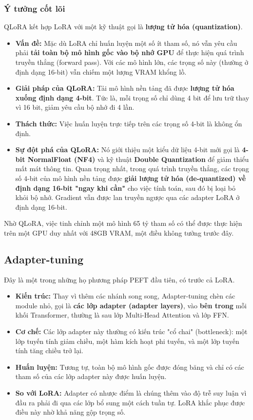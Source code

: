 \subsubsection{Ý tưởng cốt lõi}
QLoRA kết hợp LoRA với một kỹ thuật gọi là \textbf{lượng tử hóa (quantization)}.
\begin{itemize}
    \item \textbf{Vấn đề:} Mặc dù LoRA chỉ huấn luyện một số ít tham số, nó vẫn yêu cầu phải \textbf{tải toàn bộ mô hình gốc vào bộ nhớ GPU} để thực hiện quá trình truyền thẳng (forward pass). Với các mô hình lớn, các trọng số này (thường ở định dạng 16-bit) vẫn chiếm một lượng VRAM khổng lồ.
    \item \textbf{Giải pháp của QLoRA:} Tải mô hình nền tảng đã được \textbf{lượng tử hóa xuống định dạng 4-bit}. Tức là, mỗi trọng số chỉ dùng 4 bit để lưu trữ thay vì 16 bit, giảm yêu cầu bộ nhớ đi 4 lần.
    \item \textbf{Thách thức:} Việc huấn luyện trực tiếp trên các trọng số 4-bit là không ổn định.
    \item \textbf{Sự đột phá của QLoRA:} Nó giới thiệu một kiểu dữ liệu 4-bit mới gọi là \textbf{4-bit NormalFloat (NF4)} và kỹ thuật \textbf{Double Quantization} để giảm thiểu mất mát thông tin. Quan trọng nhất, trong quá trình truyền thẳng, các trọng số 4-bit của mô hình nền tảng được \textbf{giải lượng tử hóa (de-quantized) về định dạng 16-bit "ngay khi cần"} cho việc tính toán, sau đó bị loại bỏ khỏi bộ nhớ. Gradient vẫn được lan truyền ngược qua các adapter LoRA ở định dạng 16-bit.
\end{itemize}

Nhờ QLoRA, việc tinh chỉnh một mô hình 65 tỷ tham số có thể được thực hiện trên một GPU duy nhất với 48GB VRAM, một điều không tưởng trước đây.

\subsection{Adapter-tuning}
\label{ssec:adapter_tuning}
Đây là một trong những họ phương pháp PEFT \cite{houlsby2019parameter} đầu tiên, có trước cả LoRA.
\begin{itemize}
    \item \textbf{Kiến trúc:} Thay vì thêm các nhánh song song, Adapter-tuning chèn các module nhỏ, gọi là \textbf{các lớp adapter (adapter layers)}, vào \textbf{bên trong} mỗi khối Transformer, thường là sau lớp Multi-Head Attention và lớp FFN.
    \item \textbf{Cơ chế:} Các lớp adapter này thường có kiến trúc "cổ chai" (bottleneck): một lớp tuyến tính giảm chiều, một hàm kích hoạt phi tuyến, và một lớp tuyến tính tăng chiều trở lại.
    \item \textbf{Huấn luyện:} Tương tự, toàn bộ mô hình gốc được đóng băng và chỉ có các tham số của các lớp adapter này được huấn luyện.
    \item \textbf{So với LoRA:} Adapter có nhược điểm là chúng thêm vào độ trễ suy luận vì đầu ra phải đi qua các lớp bổ sung một cách tuần tự. LoRA khắc phục được điều này nhờ khả năng gộp trọng số.
\end{itemize}

